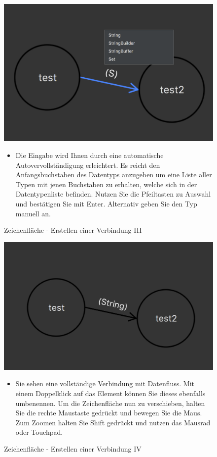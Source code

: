 \begin{figure}[h!]
	\centering
	\includegraphics[width=.4\textwidth]{Zeichenflaeche_Basics3.png}
	\caption{Zeichenfläche - Erstellen einer Verbindung III}	
\begin{itemize}	
\item Die Eingabe wird Ihnen durch eine automatische Autovervollständigung erleichtert. Es reicht den Anfangsbuchstaben des Datentyps anzugeben um eine Liste aller Typen mit jenen Buchstaben zu erhalten, welche sich in der Datentypenliste befinden. Nutzen Sie die Pfeiltasten zu Auswahl und bestätigen Sie mit Enter. Alternativ geben Sie den Typ manuell an.
\end{itemize}
\end{figure}

\begin{figure}[h!]
	\centering
	\includegraphics[width=.4\textwidth]{Zeichenflaeche_Basics4.png}
	\caption{Zeichenfläche - Erstellen einer Verbindung IV}	
\begin{itemize}	
\item Sie sehen eine vollständige Verbindung mit Datenfluss. Mit einem Doppelklick auf das Element können Sie dieses ebenfalls umbenennen. Um die Zeichenfläche nun zu verschieben, halten Sie die rechte Maustaste gedrückt und bewegen Sie die Maus. Zum Zoomen halten Sie Shift gedrückt und nutzen das Mausrad oder Touchpad.
\end{itemize}
\end{figure}

